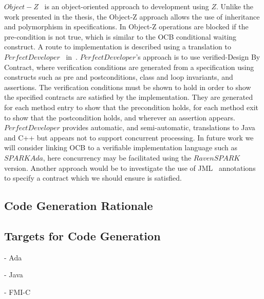$Object-Z$~\cite{GSmith2000} is an object-oriented approach to development using $Z$. Unlike the work presented in the thesis, the Object-Z approach allows the use of inheritance and polymorphism in specifications. In Object-Z operations are blocked if the pre-condition is not true, which is similar to the OCB conditional waiting construct. A route to implementation is described using a translation to $PerfectDeveloper$~\cite{PD} in~\cite{Stevens06}. $PerfectDeveloper$'s approach is to use verified-Design By Contract, where verification conditions are generated from a specification using constructs such as pre and postconditions, class and loop invariants, and assertions. The verification conditions must be shown to hold in order to show the specified contracts are satisfied by the implementation. They are generated for each method entry to show that the precondition holds, for each method exit to show that the postcondition holds, and wherever an assertion appears. $PerfectDeveloper$ provides automatic, and semi-automatic, translations to Java and C++ but appears not to support concurrent processing. In future work we will consider linking OCB to a verifiable implementation language such as $SPARKAda$, here concurrency may be facilitated using the $RavenSPARK$ version. Another approach would be to investigate the use of JML~\cite{draftJML} annotations to specify a contract which we should ensure is satisfied.

\subsection{Code Generation Rationale}


\subsection{Targets for Code Generation}

- Ada

- Java

- FMI-C
